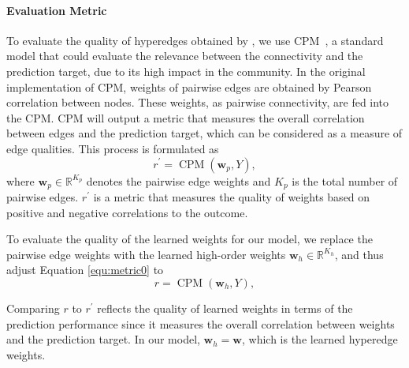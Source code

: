 \paragraph{Evaluation Metric}
To evaluate the quality of hyperedges obtained by \hybrid, we use CPM~\citep{shen2017using}, a standard model that could evaluate the relevance between the connectivity and the prediction target, due to its high impact in the community. 
In the original implementation of CPM, weights of pairwise edges are obtained by Pearson correlation between nodes. These weights, as pairwise connectivity, are fed into the CPM. CPM will output a metric that measures the overall correlation between edges and the prediction target, which can be considered as a measure of edge qualities. This process is formulated as 
\begin{equation}
\label{equ:metric0}
    r^\prime = \operatorname{CPM}(\boldsymbol{w}_p, Y),
\end{equation}
where $\boldsymbol{w}_p \in \mathbb{R}^{K_p}$ denotes the pairwise edge weights and $K_p$ is the total number of pairwise edges. $r^\prime$ is a metric that measures the quality of weights based on positive and negative correlations to the outcome. 

To evaluate the quality of the learned weights for our model, we replace the pairwise edge weights with the learned high-order weights $\boldsymbol{w}_h \in \mathbb{R}^{K_h}$, and thus adjust Equation \ref{equ:metric0} to 
\begin{equation}
\label{equ:metric}
    r = \operatorname{CPM}(\boldsymbol{w}_h, Y),
\end{equation}

Comparing $r$ to $r^\prime$ reflects the quality of learned weights in terms of the prediction performance since it measures the overall correlation between weights and the prediction target. In our model, $\boldsymbol{w}_h = \boldsymbol{w}$, which is the learned hyperedge weights.


